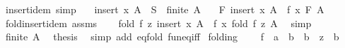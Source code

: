 \begin{isabellebody}
\endisatagproof
{\isafoldproof}%
%
\isadelimproof
\isanewline
%
\endisadelimproof
\isanewline
{}\isamarkupfalse%
\ insert{\isacharunderscore}{\kern0pt}idem\ {\isacharbrackleft}{\kern0pt}simp{\isacharbrackright}{\kern0pt}{\isacharcolon}{\kern0pt}\isanewline
\ \ \ {\isachardoublequoteopen}insert\ x\ A\ {\isasymsubseteq}\ S{\isachardoublequoteclose}\ \ {\isachardoublequoteopen}finite\ A{\isachardoublequoteclose}\isanewline
\ \ \ {\isachardoublequoteopen}F\ {\isacharparenleft}{\kern0pt}insert\ x\ A{\isacharparenright}{\kern0pt}\ {\isacharequal}{\kern0pt}\ f\ x\ {\isacharparenleft}{\kern0pt}F\ A{\isacharparenright}{\kern0pt}{\isachardoublequoteclose}\isanewline
%
\isadelimproof
%
\endisadelimproof
%
\isatagproof
{}\isamarkupfalse%
\ {\isacharminus}{\kern0pt}\isanewline
\ \ \isamarkupfalse%
\ fold{\isacharunderscore}{\kern0pt}insert{\isacharunderscore}{\kern0pt}idem\ assms\isanewline
\ \ \isamarkupfalse%
\ {\isachardoublequoteopen}fold\ f\ z\ {\isacharparenleft}{\kern0pt}insert\ x\ A{\isacharparenright}{\kern0pt}\ {\isacharequal}{\kern0pt}\ f\ x\ {\isacharparenleft}{\kern0pt}fold\ f\ z\ A{\isacharparenright}{\kern0pt}{\isachardoublequoteclose}\ \isamarkupfalse%
\ simp\isanewline
\ \ \isamarkupfalse%
\ {\isacartoucheopen}finite\ A{\isacartoucheclose}\ \isamarkupfalse%
\ {\isacharquery}{\kern0pt}thesis\ \isamarkupfalse%
\ {\isacharparenleft}{\kern0pt}simp\ add{\isacharcolon}{\kern0pt}\ eq{\isacharunderscore}{\kern0pt}fold\ fun{\isacharunderscore}{\kern0pt}eq{\isacharunderscore}{\kern0pt}iff{\isacharparenright}{\kern0pt}\isanewline
{}\isamarkupfalse%
%
\endisatagproof
{\isafoldproof}%
%
\isadelimproof
\isanewline
%
\endisadelimproof
\isanewline
{}\isamarkupfalse%
%
\isadelimdocument
%
\endisadelimdocument
%
\isatagdocument
%
\isamarkuptrue%
%
\endisatagdocument
{\isafolddocument}%
%
\isadelimdocument
%
\endisadelimdocument
{}\isamarkupfalse%
\ folding\ {\isacharequal}{\kern0pt}\isanewline
\ \ \ f\ {\isacharcolon}{\kern0pt}{\isacharcolon}{\kern0pt}\ {\isachardoublequoteopen}{\isacharprime}{\kern0pt}a\ {\isasymRightarrow}\ {\isacharprime}{\kern0pt}b\ {\isasymRightarrow}\ {\isacharprime}{\kern0pt}b{\isachardoublequoteclose}\ \ z\ {\isacharcolon}{\kern0pt}{\isacharcolon}{\kern0pt}\ {\isachardoublequoteopen}{\isacharprime}{\kern0pt}b{\isachardoublequoteclose}\isanewline

\end{isabellebody}
